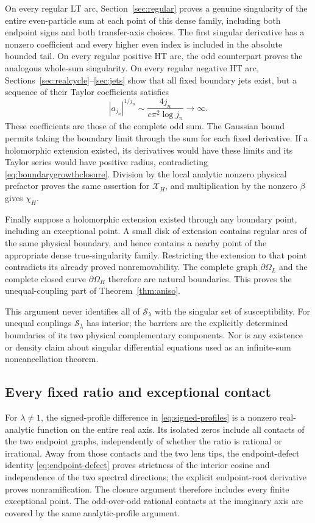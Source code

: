 \documentclass[11pt]{article}
\numberwithin{equation}{section}
\theoremstyle{definition}
\newcommand{\cS}{\mathcal S}
\newcommand{\OH}{\Omega_H}
\newcommand{\OL}{\Omega_L}
\newcommand{\XH}{\mathcal X_H}
\begin{document}
On every regular LT arc, Section~\ref{sec:regular} proves a genuine
singularity of the entire even-particle sum at each point of this dense
family, including both endpoint signs and both transfer-axis choices.
The first singular derivative has a nonzero coefficient and every
higher even index is included in the absolute bounded tail. On every
regular positive HT arc, the odd counterpart proves the analogous
whole-sum singularity. On every regular negative HT arc,
Sections~\ref{sec:realcycle}--\ref{sec:jets} show that all fixed boundary
jets exist, but a sequence of their Taylor coefficients satisfies
\begin{equation}\label{eq:boundarygrowthclosure}
 |a_{j_n}|^{1/j_n}\sim\frac{4j_n}{e\pi^2\log j_n}\longrightarrow\infty.
\end{equation}
These coefficients are those of the complete odd sum. The Gaussian
bound permits taking the boundary limit through the sum for each fixed
derivative. If a holomorphic extension existed, its derivatives would
have these limits and its Taylor series would have positive radius,
contradicting \eqref{eq:boundarygrowthclosure}. Division by the local
analytic nonzero physical prefactor proves the same assertion for
$\XH$, and multiplication by the nonzero $\beta$ gives $\chi_H$.

Finally suppose a holomorphic extension existed through any boundary
point, including an exceptional point. A small disk of extension contains
regular arcs of the same physical boundary, and hence contains a nearby
point of the appropriate dense true-singularity family. Restricting the
extension to that point contradicts its already proved nonremovability.
The complete graph $\partial\OL$ and the complete closed curve
$\partial\OH$ therefore are natural boundaries. This proves
the unequal-coupling part of Theorem~\ref{thm:aniso}.

This argument never identifies all of $\cS_\lambda$ with the singular
set of susceptibility. For unequal couplings $\cS_\lambda$ has interior;
the barriers are the explicitly determined boundaries of its two
physical complementary components. Nor is any existence or density
claim about singular differential equations used as an infinite-sum
noncancellation theorem.

\subsection{Every fixed ratio and exceptional contact}
For $\lambda\ne1$, the signed-profile difference in
\eqref{eq:signed-profiles} is a nonzero real-analytic function on
the entire real axis. Its isolated zeros include all contacts of the
two endpoint graphs, independently of whether the ratio is rational
or irrational. Away from those contacts and the two lens tips, the
endpoint-defect identity \eqref{eq:endpoint-defect} proves strictness
of the interior cosine and independence of the two spectral directions;
the explicit endpoint-root derivative proves nonramification.
The closure argument therefore includes every finite exceptional point.
The odd-over-odd rational contacts at the imaginary axis are covered by
the same analytic-profile argument.
\end{document}
